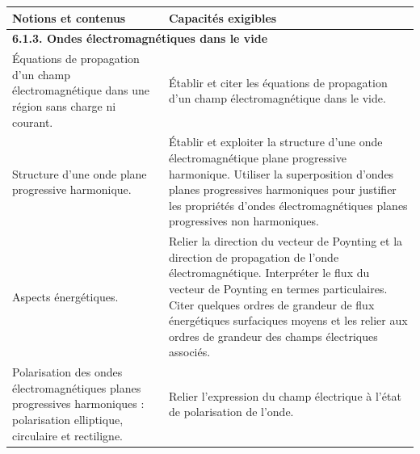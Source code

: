 {\scriptsize
        \begin{tabularx}{\textwidth}{|p{}|X|}
            \hline 
            \textbf{Notions et contenus} & \textbf{Capacités exigibles} \\
            \hline 
            \multicolumn{2}{|l|}{\textbf{6.1.3. Ondes électromagnétiques dans le vide }} \\
            \hline
            Équations de propagation d'un champ électromagnétique dans une région sans charge ni courant.  & 
            Établir et citer les équations de propagation d'un champ électromagnétique dans le vide. \\
            \hline 
            Structure d'une onde plane progressive harmonique.   & 
            Établir et exploiter la structure d'une onde électromagnétique plane progressive harmonique.
Utiliser la superposition d'ondes planes progressives harmoniques pour justifier les propriétés d'ondes électromagnétiques planes progressives non harmoniques. \\
        \hline 
         Aspects énergétiques. & 
         Relier la direction du vecteur de Poynting et la direction de propagation de l'onde électromagnétique.
         Interpréter le flux du vecteur de Poynting en termes particulaires.
         Citer quelques ordres de grandeur de flux énergétiques surfaciques moyens et les relier aux ordres de grandeur des champs électriques associés. \\ 
        \hline
        Polarisation des ondes électromagnétiques planes progressives harmoniques : polarisation elliptique, circulaire et rectiligne.  & 
        Relier l'expression du champ électrique à l'état de polarisation de l'onde. \\
        \hline 
        \end{tabularx}
\vspace{0.5cm}
}

